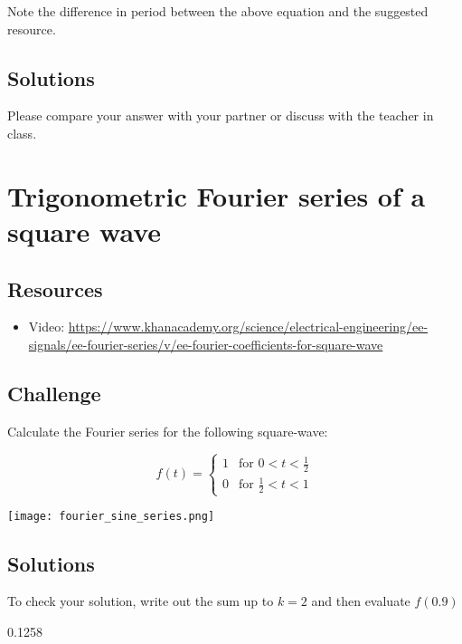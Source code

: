 Note the difference in period between the above equation and the suggested resource.

\subsection*{Solutions}
Please compare your answer with your partner or discuss with the teacher in class.




\newpage
\section{Trigonometric Fourier series of a square wave}
\label{sec:1stsqwch}

\subsection*{Resources}
\begin{itemize}
    \item Video: \url{https://www.khanacademy.org/science/electrical-engineering/ee-signals/ee-fourier-series/v/ee-fourier-coefficients-for-square-wave}
\end{itemize}

\subsection*{Challenge}
Calculate the Fourier series for the following square-wave:

\begin{equation}
   f(t) =
   \begin{cases}
       1 & \text{for } 0 < t < \frac{1}{2} \\
       0 & \text{for } \frac{1}{2} < t < 1
   \end{cases} 
\end{equation}

\texttt{[image: fourier\_sine\_series.png]}

\subsection*{Solutions}
To check your solution, write out the sum up to $k=2$ and then evaluate $f(0.9)$

0.1258



\newpage
